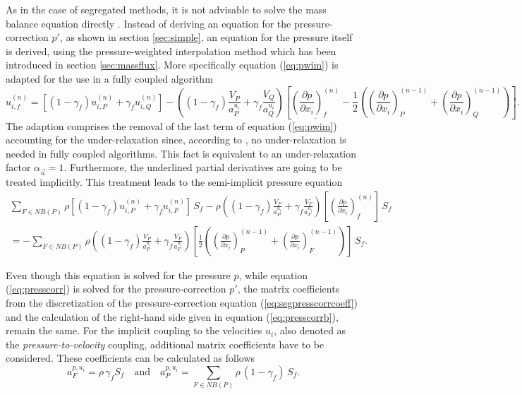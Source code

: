 As in the case of segregated methods, it is not advisable to solve the mass balance equation directly \cite{schaefer99}. Instead of deriving an equation for the pressure-correction \(p'\), as shown in section \ref{sec:simple}, an equation for the pressure itself is derived, using the pressure-weighted interpolation method which has been introduced in section \ref{sec:massflux}. More specifically equation (\ref{eq:pwim}) is adapted for the use in a fully coupled algorithm
\begin{displaymath}
  u_{i,f}^{(n)} 
  =
  \left[\left(1 - \gamma_f\right) u_{i,P}^{(n)} + \gamma_f u_{i,Q}^{(n)} \right]
  - \left(\left(1 - \gamma_f\right) \frac{V_P}{a_P^{u_i}} + \gamma_f \frac{ V_Q}{a_Q^{u_i}}\right)
  \left[ 
    \underline{ \left(\frac{\partial p}{\partial x_i}\right)_f^{(n)}}
  - \frac{1}{2} 
  \left( 
    \left( \frac{\partial p}{\partial x_i} \right)_P^{(n-1)} 
  + \left(\frac{\partial p}{\partial x_i}\right)_Q^{(n-1)} 
  \right)
  \right].
\end{displaymath}
The adaption comprises the removal of the last term of equation (\ref{eq:pwim}) accounting for the under-relaxation since, according to \cite{darwish09}, no under-relaxation is needed in fully coupled algorithms.  This fact is equivalent to an under-relaxation factor \(\alpha_\vec{u} = 1\). Furthermore, the underlined partial derivatives are going to be treated implicitly. This treatment leads to the semi-implicit pressure equation
\begin{align*}
  \sum_{F \in NB(P)} 
  \rho
  \left[\left(1 - \gamma_f\right) u_{i,P}^{(n)} + \gamma_f u_{i,F}^{(n)} \right]\,  S_f
  - \rho \left(\left(1 - \gamma_f\right) \frac{ V_P}{a_P^{u_i}} + \gamma_f \frac{ V_F}{a_F^{u_i}}\right)
  \left[ 
  \left(\frac{\partial p}{\partial x_i}\right)_f^{(n)}
  \right]\,  S_f \nonumber \\
  =
  - \sum_{F \in NB(P)}
  \rho
  \left(\left(1 - \gamma_f\right) \frac{ V_P}{a_P^{u_i}} + \gamma_f \frac{ V_F}{a_F^{u_i}}\right)
  \left[ 
  \frac{1}{2} 
  \left( 
    \left( \frac{\partial p}{\partial x_i} \right)_P^{(n-1)} 
  + \left(\frac{\partial p}{\partial x_i}\right)_F^{(n-1)} 
  \right)
  \right] \, S_f.
\end{align*}

Even though this equation is solved for the pressure \(p\), while equation (\ref{eq:presscorr}) is solved for the pressure-correction \(p'\), the matrix coefficients from the discretization of the pressure-correction equation (\ref{eq:segpresscorrcoeff}) and the calculation of the right-hand side given in equation (\ref{eq:presscorrb}), remain the same. For the implicit coupling to the velocities \(u_i\), also denoted as the \emph{pressure-to-velocity} coupling, additional matrix coefficients have to be considered. These coefficients can be calculated as follows
\begin{displaymath}
  a_F^{p,u_i} = \rho \, \gamma_f S_f \quad \text{and} \quad a_P^{p,u_i} = \sum_{F \in NB(P)} \rho \, (1-\gamma_f) \, S_f.
\end{displaymath}

